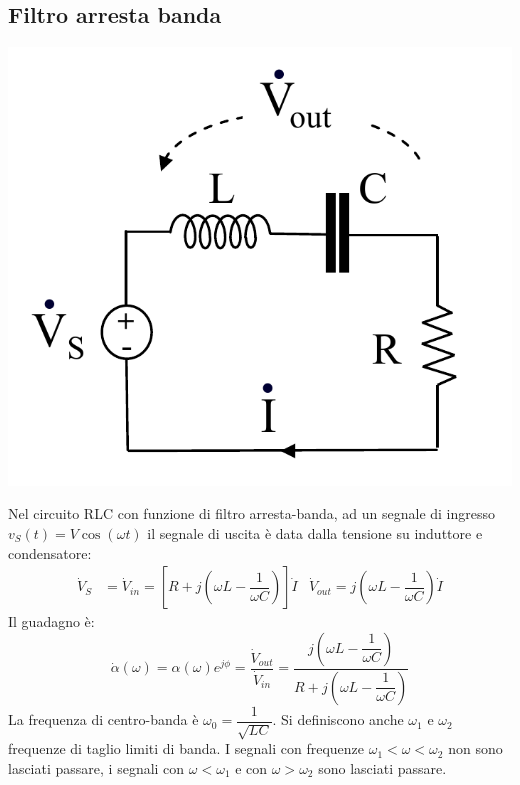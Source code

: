\documentclass{article}
\begin{document}
\subsection{Filtro arresta banda}
\begin{center}
    \includegraphics[scale=0.3]{Image/Arresta-banda_1.png}
\end{center}
Nel circuito RLC con funzione di filtro arresta-banda, ad un segnale di ingresso $v_S(t) = V \cos(\omega t)$ il segnale di uscita è data dalla tensione su induttore e condensatore:
\begin{align*}
    \dot V_S &= \dot V_{in} = \left[R + j\left(\omega L - \dfrac{1}{\omega C}\right)\right] \dot I & \dot V_{out} = j \left(\omega L - \dfrac{1}{\omega C}\right) \dot I
\end{align*}
Il guadagno è:
\[\dot \alpha(\omega)=\alpha(\omega) e^{j \phi}=\frac{\dot V_{out}}{\dot V_{in}}=\frac{j\left(\omega L - \dfrac{1}{\omega C}\right)}{R + j\left(\omega L - \dfrac{1}{\omega C}\right)}\]
La frequenza di centro-banda è $\omega_0= \dfrac{1}{\sqrt{LC}}$. Si definiscono anche $\omega_1$ e $\omega_2$ frequenze di taglio limiti di banda. I segnali con frequenze $\omega_1<\omega<\omega_2$ non sono lasciati passare, i segnali con $\omega < \omega_1$ e con $\omega > \omega_2$ sono lasciati passare.
\end{document}
